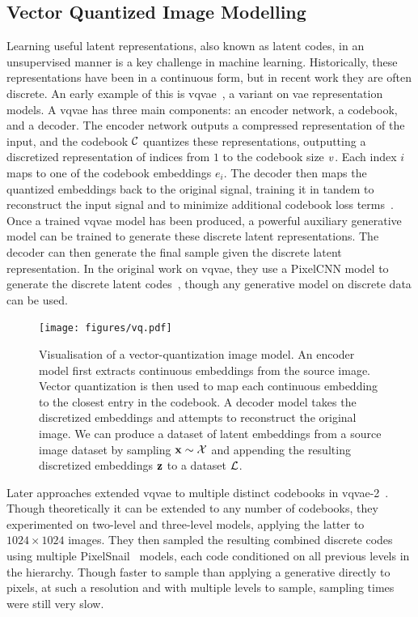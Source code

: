 \subsection{Vector Quantized Image Modelling}
\label{subsec:vqmodelling}

Learning useful latent representations, also known as latent codes, in an
unsupervised manner is a key challenge in machine learning. Historically, these
representations have been in a continuous form, but in recent work they are
often discrete. An early example of this is \gls{vqvae}~\cite{oord2017vqvae}, a
variant on \gls{vae} representation models. A \gls{vqvae} has three main
components: an encoder network, a codebook, and a decoder. The encoder network
outputs a compressed representation of the input, and the codebook
$\mathcal{C}$ quantizes these representations, outputting a discretized
representation of indices from $1$ to the codebook size $v$. Each
index $i$ maps to one of the codebook embeddings $e_i$. The decoder then maps
the quantized embeddings back to the original signal, training it in tandem to
reconstruct the input signal and to minimize additional codebook loss
terms~\cite{oord2017vqvae}. Once a trained \gls{vqvae} model has been produced,
a powerful auxiliary generative model can be trained to generate these discrete
latent representations. The decoder can then generate the final sample given the
discrete latent representation. In the original work on \gls{vqvae}, they use a
PixelCNN model to generate the discrete latent codes~\cite{oord2017vqvae},
though any generative model on discrete data can be used.

\begin{figure}[ht!]
    \centering
    \texttt{[image: figures/vq.pdf]}
    \caption{
        Visualisation of a vector-quantization image model. An encoder model
        first extracts continuous embeddings from the source image. Vector
        quantization is then used to map each continuous embedding to the
        closest entry in the codebook. A decoder model takes the discretized
        embeddings and attempts to reconstruct the original image. We can
        produce a dataset of latent embeddings from a source image dataset 
        by sampling $\mathbf{x} \sim \mathcal{X}$ and appending the resulting
        discretized embeddings $\mathbf{z}$ to a dataset $\mathcal{L}$.
    }
\end{figure}

Later approaches extended \gls{vqvae} to multiple distinct codebooks in
\acrshort{vqvae}-2~\cite{razavi2019generating}. Though theoretically it can be
extended to any number of codebooks, they experimented on two-level and
three-level models, applying the latter to $1024 \times 1024$ images. They then
sampled the resulting combined discrete codes using multiple
PixelSnail~\cite{chen2017snail} models, each code conditioned on all previous
levels in the hierarchy. Though faster to sample than applying a generative
directly to pixels, at such a resolution and with multiple levels to sample,
sampling times were still very slow.

